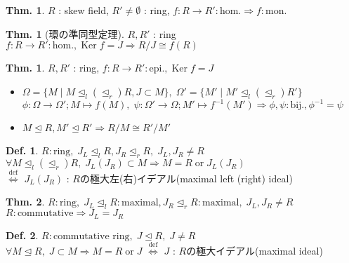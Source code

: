 \documentclass[uplatex,dvipdfmx,9pt]{beamer}
\newcommand{\defarrow}{\overset{\mathrm{def}}{\Leftrightarrow}}
\newcommand{\inverse}[1]{#1^{-1}}
\newcommand{\Ker}{\operatorname{Ker}}
\newcommand{\lideal}{\trianglelefteq_l}
\newcommand{\rideal}{\trianglelefteq_r}
\newcommand{\ideal}{\trianglelefteq}
\newcommand{\bij}{\text{bij.}}
\renewcommand{\hom}{\text{hom.}} %
\newcommand{\mon}{\text{mon.}} %
\newcommand{\epi}{\text{epi.}} %
\newcounter{textThmCount}
\theoremstyle{definition} %
\newtheorem{defn}{Def.}[subsection] %
\newtheorem{thm}{Thm.}[subsection] %
\newtheorem{thmText}[textThmCount]{Thm.}
\theoremstyle{example}
\begin{document}
\begin{frame}

  \begin{thm}
    $R$ : skew field, $R' \neq \emptyset$ : ring, $f\colon R \to R' : \hom \Rightarrow f : \mon$
  \end{thm}

  \begin{thmText}[環の準同型定理]
    $R, R'$ : ring \\
    $f\colon R \to R' : \hom, \Ker f = J \Rightarrow R/J \cong f(R)$
  \end{thmText}

  \begin{thmText}
    $R, R'$ : ring, $f\colon R \to R' : \epi, \Ker f = J$ \\
    \begin{itemize}
      \item $\Omega = \{M \mid M \lideal(\rideal) R, J \subset M\}, \; \Omega' = \{M' \mid M' \lideal(\rideal) R'\}$ \\
            $\phi\colon \Omega \to \Omega' ; M \mapsto f(M), \; \psi\colon \Omega' \to \Omega ; M' \mapsto \inverse{f}(M') \Rightarrow \phi, \psi : \bij, \inverse{\phi} = \psi$
      \item $M \ideal R, M' \ideal R' \Rightarrow R/M \cong R'/M'$
    \end{itemize}
  \end{thmText}

\end{frame}

\begin{frame}

  \begin{defn}
    $R : \text{ring}, \; J_L \lideal R, J_R \rideal R, \; J_L, J_R \neq R$ \\
    $\forall M \lideal (\rideal) R, \; J_L(J_R) \subset M \Rightarrow M = R \; \text{or} \; J_L(J_R)$ \\
    $\defarrow$ $J_L(J_R)$ : $R$の\alert{極大左(右)イデアル(maximal left (right) ideal)} \\
  \end{defn}

  \begin{thm}
    $R : \text{ring}, \; J_L \lideal R : \text{maximal}, J_R \rideal R : \text{maximal}, \; J_L, J_R \neq R$ \\
    $R : \text{commutative} \Rightarrow J_L = J_R$
  \end{thm}

  \begin{defn}
    $R : \text{commutative ring}, \; J \ideal R, \; J \neq R$ \\
    $\forall M \ideal R, \; J \subset M \Rightarrow M = R \; \text{or} \; J$ $\defarrow$ $J$ : $R$の\alert{極大イデアル(maximal ideal)}
  \end{defn}

\end{frame}
\end{document}
